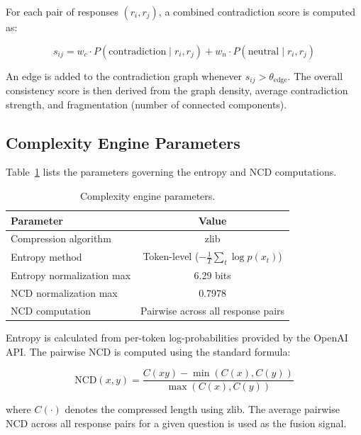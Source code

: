 For each pair of responses $(r_i, r_j)$, a combined contradiction score is computed as:

\begin{equation}
    s_{ij} = w_c \cdot P(\text{contradiction} \mid r_i, r_j) + w_n \cdot P(\text{neutral} \mid r_i, r_j)
    \label{eq:nli-scoring}
\end{equation}

An edge is added to the contradiction graph whenever $s_{ij} > \theta_{\text{edge}}$. The overall consistency score is then derived from the graph density, average contradiction strength, and fragmentation (number of connected components).

\subsection{Complexity Engine Parameters}

Table~\ref{tab:complexity-params} lists the parameters governing the entropy and NCD computations.

\begin{table}[!htbp]
    \centering
    \caption{Complexity engine parameters.}
    \label{tab:complexity-params}
    \begin{tabular}{lc}
        \toprule
        \textbf{Parameter} & \textbf{Value} \\
        \midrule
        Compression algorithm     & zlib \\
        Entropy method            & Token-level ($-\frac{1}{T}\sum_t \log p(x_t)$) \\
        Entropy normalization max & 6.29 bits \\
        NCD normalization max     & 0.7978 \\
        NCD computation           & Pairwise across all response pairs \\
        \bottomrule
    \end{tabular}
\end{table}

Entropy is calculated from per-token log-probabilities provided by the OpenAI API. The pairwise NCD is computed using the standard formula:

\begin{equation}
    \text{NCD}(x, y) = \frac{C(xy) - \min(C(x), C(y))}{\max(C(x), C(y))}
    \label{eq:ncd}
\end{equation}

\noindent where $C(\cdot)$ denotes the compressed length using zlib. The average pairwise NCD across all response pairs for a given question is used as the fusion signal.

